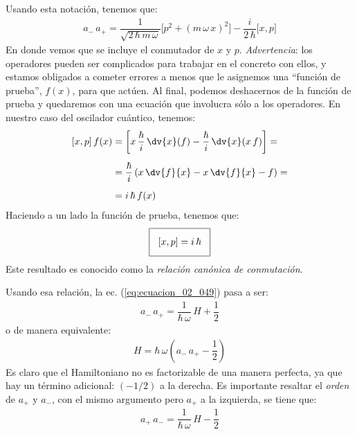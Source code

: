 Usando esta notación, tenemos que:
\begin{align}
a_{-} \, a_{+} = \dfrac{1}{\sqrt{2 \, \hbar \, m \, \omega }} \big[ p^{2} + (m \, \omega \, x)^{2} \big] - \dfrac{i}{2 \, \hbar} \big[ x , p \big]
\label{eq:ecuacion_02_049}
\end{align}
En donde vemos que se incluye el conmutador de $x$ y $p$. 
\emph{Advertencia}: los operadores pueden ser complicados para trabajar en el concreto con ellos, y estamos obligados a cometer errores a menos que le asignemos una \enquote{función de prueba}, $f (x)$, para que actúen. Al final, podemos deshacernos de la función de prueba y quedaremos con una ecuación que involucra sólo a los operadores. En nuestro caso del oscilador cuántico, tenemos:
\begin{align}
\begin{aligned}[b]
[x, p] \, f(x) &= \left[ x \, \dfrac{\hbar}{i} \, \dv{x} (f) - \dfrac{\hbar}{i} \, \dv{x} (x \, f) \right] = \\[0.5em]
&= \dfrac{\hbar}{i} \left( x \, \dv{f}{x} - x \,\dv{f}{x} - f \right) = \\[0.5em]
&= i \, \hbar \, f(x)
\end{aligned}
\label{eq:ecuacion_02_050}
\end{align}
Haciendo a un lado la función de prueba, tenemos que:
\begin{align}
\setlength{\fboxsep}{3\fboxsep}\boxed{
[x, p] = i \, \hbar
}
\label{eq:ecuacion_02_051}
\end{align}
Este resultado es conocido como la \emph{relación canónica de conmutación}.
\par
Usando esa relación, la ec. (\ref{eq:ecuacion_02_049}) pasa a ser:
\begin{align}
a_{-} \, a_{+} = \dfrac{1}{\hbar \, \omega} \, H + \dfrac{1}{2}
\label{ec:ecuacion_02_052}
\end{align}
o de manera equivalente:
\begin{align}
H = \hbar \, \omega \left( a_{-} \, a_{+} - \dfrac{1}{2} \right)
\label{ec:ecuacion_02_053}
\end{align}
Es claro que el Hamiltoniano no es factorizable de una manera perfecta, ya que hay un término adicional: $(-1/2)$ a la derecha. Es importante resaltar el \emph{orden} de $a_{+}$ y $a_{-}$, con el mismo argumento pero $a_{+}$ a la izquierda, se tiene que:
\begin{align}
a_{+} \, a_{-} = \dfrac{1}{\hbar \, \omega} \, H - \dfrac{1}{2}
\label{eq:ecuacion_02_054}
\end{align}
